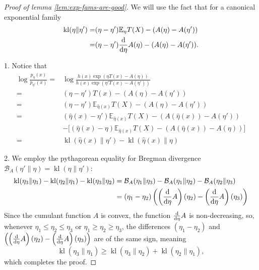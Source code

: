 \documentclass{article}
\theoremstyle{definition}
\theoremstyle{definition}
\newcommand{\expectE}{\mathbb{E}}
\newcommand{\kl}{\operatorname{kl}}
\begin{document}
\begin{proof}[Proof of lemma \ref{lem:exp-fams-are-good}]
    We will use the fact that for a canonical exponential family 
    \begin{align*}
        \kl(\eta \| \eta') =& (\eta - \eta')\expectE_{\eta}T(X) - (A(\eta) - A(\eta'))\\
        =& (\eta - \eta')\frac{{\rm d}}{{\rm d}\eta}A(\eta) - (A(\eta) - A(\eta')).
    \end{align*}

    1. Notice that
    \begin{align*}
        \log \frac{p_\eta(x)}{p_{\eta'}(x)} 
        =& \log \frac{h(x)\exp\left(\eta T(x) - A(\eta)\right)}{h(x)\exp\left(\eta' T(x) - A(\eta')\right)}
        \\
        =& (\eta - \eta')T(x) - (A(\eta) - A(\eta'))\\
        =& (\eta - \eta')\expectE_{\hat\eta (x)}T(X) - (A(\eta) - A(\eta'))\\
        =& (\hat\eta(x) - \eta')\expectE_{\hat\eta (x)} T(X) - (A(\hat\eta(x)) - A(\eta'))\\
        &- \big[ (\hat\eta(x) - \eta)\expectE_{\hat\eta (x)} T(X) - (A(\hat\eta(x)) - A(\eta)) \big]\\
        =& \kl(\hat\eta(x) \| \eta') - \kl(\hat\eta(x) \| \eta)
    \end{align*}

    2. We employ the pythagorean equality for Bregman divergence $\mathcal{B}_{A}(\eta' \| \eta)=\kl(\eta \| \eta')$:
    \begin{align*}
        \kl(\eta_3 \| \eta_1) - \kl(\eta_2 \| \eta_1) - \kl(\eta_3 \| \eta_2) &=
        \mathcal{B}_{A}(\eta_1\|\eta_3) - \mathcal{B}_{A}(\eta_1 \| \eta_2) - \mathcal{B}_{A} (\eta_2 \| \eta_3)
        \\&=(\eta_1 - \eta_2)\left(\left(\frac{\rm d}{{\rm d}\eta}A\right)(\eta_2) - \left(\frac{\rm d}{{\rm d}\eta}A\right)(\eta_3)\right)
    \end{align*}
    Since the cumulant function $A$ is convex, the function $\frac{\rm d}{{\rm d}\eta}A$ is non-decreasing, so, whenever $\eta_1 \le \eta_2 \le \eta_3$ or $\eta_1 \ge \eta_2 \ge \eta_3$, the differences $(\eta_1 - \eta_2)$ and $\left(\left(\frac{\rm d}{{\rm d}\eta}A\right)(\eta_2) - \left(\frac{\rm d}{{\rm d}\eta}A\right)(\eta_3)\right)$ are of the same sign, meaning
    \[
        \kl(\eta_3 \| \eta_1) \ge \kl(\eta_3 \| \eta_2) +\kl(\eta_2 \| \eta_1),
    \]
    which completes the proof.
\end{proof}
\end{document}
